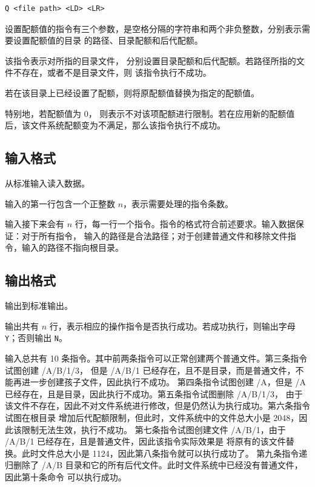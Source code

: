 \begin{lstlisting}
Q <file path> <LD> <LR>
\end{lstlisting}

设置配额值的指令有三个参数，是空格分隔的字符串和两个非负整数，分别表示需要设置配额值的目录
的路径、目录配额和后代配额。

该指令表示对所指的目录文件，
分别设置目录配额和后代配额。若路径所指的文件不存在，或者不是目录文件，则
该指令执行不成功。

若在该目录上已经设置了配额，则将原配额值替换为指定的配额值。

特别地，若配额值为 0，
则表示不对该项配额进行限制。若在应用新的配额值后，该文件系统配额变为不满足，那么该指令执行不成功。


\subsection*{输入格式}

从标准输入读入数据。

输入的第一行包含一个正整数 $n$，表示需要处理的指令条数。

输入接下来会有 $n$ 行，每一行一个指令。指令的格式符合前述要求。输入数据保证：对于所有指令，
输入的路径是合法路径；对于创建普通文件和移除文件指令，输入的路径不指向根目录。


\subsection*{输出格式}

输出到标准输出。

输出共有 $n$ 行，表示相应的操作指令是否执行成功。若成功执行，则输出字母 \verb|Y|；否则输出 \verb|N|。

\examplebox*{}{}

输入总共有 10 条指令。其中前两条指令可以正常创建两个普通文件。第三条指令试图创建 /A/B/1/3，
但是 /A/B/1 已经存在，且不是目录，而是普通文件，不能再进一步创建孩子文件，因此执行不成功。
第四条指令试图创建 /A，但是 /A 已经存在，且是目录，因此执行不成功。第五条指令试图删除 /A/B/1/3，
由于该文件不存在，因此不对文件系统进行修改，但是仍然认为执行成功。第六条指令试图在根目录
增加后代配额限制，但此时，文件系统中的文件总大小是 2048，因此该限制无法生效，执行不成功。
第七条指令试图创建文件 /A/B/1，由于 /A/B/1 已经存在，且是普通文件，因此该指令实际效果是
将原有的该文件替换。此时文件总大小是 1124，因此第八条指令就可以执行成功了。
第九条指令递归删除了 /A/B 目录和它的所有后代文件。此时文件系统中已经没有普通文件，因此第十条命令
可以执行成功。

